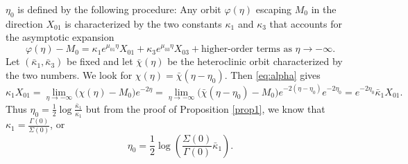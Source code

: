 \documentclass[a4paper,11pt]{article}
\theoremstyle{remark}
\begin{document}
$\eta_0$ is defined by the following procedure:  Any orbit $\varphi(\eta)$ escaping $M_0$ in the direction $X_{01}$ is characterized by the two constants $\kappa_1$ and $\kappa_3$ that accounts for the asymptotic expansion %
 \begin{equation}\label{eq:alpha-expan}
  \varphi(\eta) - M_0 = \kappa_1 e^{\mu_{01}\eta} X_{01} + \kappa_3 e^{\mu_{03}\eta}X_{03} + \text{higher-order terms as $\eta \rightarrow -\infty$}.
 \end{equation}
Let $(\bar\kappa_1,\bar\kappa_3)$ be fixed and let $\bar\chi(\eta)$ be the heteroclinic orbit characterized by the two numbers. We look for $\chi(\eta) = \bar\chi(\eta-\eta_0)$. Then \eqref{eq:alpha} gives
$$\kappa_1 X_{01}=\lim_{\eta \rightarrow -\infty}\big(\chi(\eta) - M_0\big)e^{-2\eta} = \lim_{\eta \rightarrow -\infty} \big(\bar\chi(\eta-\eta_0) - M_0\big)e^{-2(\eta-\eta_0)}e^{-2\eta_0} = e^{-2\eta_0}\bar\kappa_1 X_{01}.$$
Thus $\eta_0 = \frac{1}{2}\log {\frac{\bar\kappa_1}{\kappa_1}}$ but from the proof of Proposition \ref{prop1}, we know that
$\kappa_1 = \frac{\Gamma(0)}{\Sigma(0)}$, or
\begin{equation}
 \eta_0 = \frac{1}{2}\log \left(\frac{\Sigma(0)}{\Gamma(0)}\bar\kappa_1\right).%
\end{equation}
\end{document}
